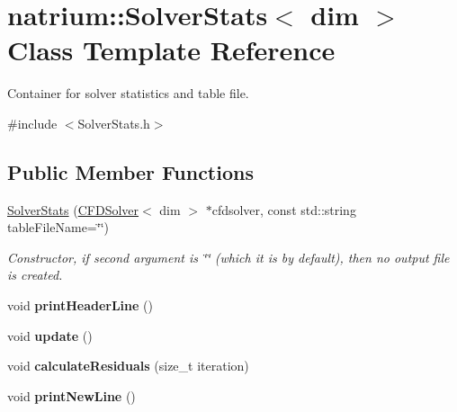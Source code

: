 \hypertarget{classnatrium_1_1SolverStats}{
\section{natrium::SolverStats$<$ dim $>$ Class Template Reference}
\label{classnatrium_1_1SolverStats}
}


Container for solver statistics and table file.  


{\ttfamily \#include $<$SolverStats.h$>$}\subsection*{Public Member Functions}
\begin{DoxyCompactItemize}
\item 
\hypertarget{classnatrium_1_1SolverStats_aaa0b74781be83337875982f0a46c67b8}{
\hyperlink{classnatrium_1_1SolverStats_aaa0b74781be83337875982f0a46c67b8}{SolverStats} (\hyperlink{classnatrium_1_1CFDSolver}{CFDSolver}$<$ dim $>$ $\ast$cfdsolver, const std::string tableFileName=\char`\"{}\char`\"{})}
\label{classnatrium_1_1SolverStats_aaa0b74781be83337875982f0a46c67b8}

\begin{DoxyCompactList}\small\item\em Constructor, if second argument is \char`\"{}\char`\"{} (which it is by default), then no output file is created. \item\end{DoxyCompactList}\item 
\hypertarget{classnatrium_1_1SolverStats_a32c66bc8d05fbd0144dc9023fd17d3a8}{
void {\bfseries printHeaderLine} ()}
\label{classnatrium_1_1SolverStats_a32c66bc8d05fbd0144dc9023fd17d3a8}

\item 
\hypertarget{classnatrium_1_1SolverStats_a15b90f4fa22d7881a0ab868f2e12680b}{
void {\bfseries update} ()}
\label{classnatrium_1_1SolverStats_a15b90f4fa22d7881a0ab868f2e12680b}

\item 
\hypertarget{classnatrium_1_1SolverStats_a67f9b6e7c5e31f66a3b0c3a5e78f6159}{
void {\bfseries calculateResiduals} (size\_\-t iteration)}
\label{classnatrium_1_1SolverStats_a67f9b6e7c5e31f66a3b0c3a5e78f6159}

\item 
\hypertarget{classnatrium_1_1SolverStats_a55101045c882c45fe3b46aa236d63604}{
void {\bfseries printNewLine} ()}
\label{classnatrium_1_1SolverStats_a55101045c882c45fe3b46aa236d63604}


\end{DoxyCompactItemize}
